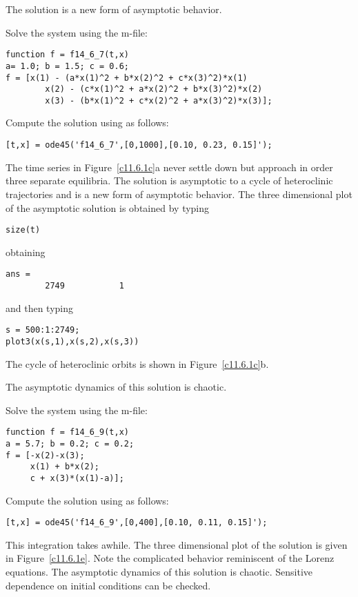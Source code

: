  \ans The solution is a new form of asymptotic behavior.

\soln Solve the system  using the m-file:
\begin{verbatim}
function f = f14_6_7(t,x)
a= 1.0; b = 1.5; c = 0.6;
f = [x(1) - (a*x(1)^2 + b*x(2)^2 + c*x(3)^2)*x(1) 
        x(2) - (c*x(1)^2 + a*x(2)^2 + b*x(3)^2)*x(2)
        x(3) - (b*x(1)^2 + c*x(2)^2 + a*x(3)^2)*x(3)];
\end{verbatim}
Compute the solution using \Matlab as follows:
\begin{verbatim}
[t,x] = ode45('f14_6_7',[0,1000],[0.10, 0.23, 0.15]');
\end{verbatim}

The time series in Figure~\ref{c11.6.1c}a never settle down but approach in 
order three separate
equilibria.  The solution is asymptotic to a cycle of heteroclinic
trajectories and is a new form of asymptotic behavior.  The three 
dimensional plot of the asymptotic solution is obtained by typing
\begin{verbatim}
size(t)
\end{verbatim}
obtaining
\begin{verbatim}
ans =
        2749           1
\end{verbatim}
and then typing
\begin{verbatim}
s = 500:1:2749;
plot3(x(s,1),x(s,2),x(s,3))
\end{verbatim}
The cycle of heteroclinic orbits is shown in Figure~\ref{c11.6.1c}b.

\begin{figure}[htb]
     \centerline{%
     }
\end{figure}


\newpage
{}  \ans The asymptotic dynamics of this solution is chaotic.

\soln Solve the system using the m-file:
\begin{verbatim}
function f = f14_6_9(t,x)
a = 5.7; b = 0.2; c = 0.2;
f = [-x(2)-x(3); 
     x(1) + b*x(2); 
     c + x(3)*(x(1)-a)];
\end{verbatim}

Compute the solution using \Matlab as follows:
\begin{verbatim}
[t,x] = ode45('f14_6_9',[0,400],[0.10, 0.11, 0.15]');
\end{verbatim}
This integration takes awhile.  The three dimensional plot of the
solution is given in Figure~\ref{c11.6.1e}.  Note the complicated behavior
reminiscent of the Lorenz equations.  The asymptotic dynamics of this
solution is chaotic.  Sensitive dependence on initial conditions can be
checked.


